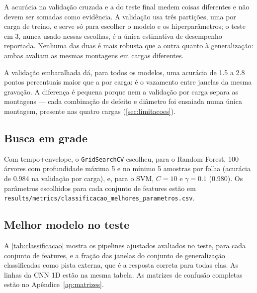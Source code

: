 A acurácia na validação cruzada e a do teste final medem coisas diferentes e
não devem ser somadas como evidência. A validação usa três partições, uma por
carga de treino, e serve só para escolher o modelo e os hiperparâmetros; o teste
em \SI{3}{\hp}, nunca usado nessas escolhas, é a única estimativa de desempenho
reportada. Nenhuma das duas é mais robusta que a outra quanto à generalização:
ambas avaliam as mesmas montagens em cargas diferentes.

A validação embaralhada dá, para todos os modelos, uma acurácia de \num{1.5} a
\num{2.8} pontos percentuais maior que a por carga: é o vazamento entre janelas da
mesma gravação. A diferença é pequena porque nem a validação por carga separa as
montagens --- cada combinação de defeito e diâmetro foi ensaiada numa única
montagem, presente nas quatro cargas (\autoref{sec:limitacoes}).

\subsection{Busca em grade}
\label{sec:res-grid}

Com tempo+envelope, o \texttt{GridSearchCV}
escolheu, para o Random Forest, 100 árvores com profundidade máxima 5 e no mínimo
5 amostras por folha (acurácia de \num{0.984} na validação por carga), e, para o
SVM, $C = 10$ e $\gamma = \num{0.1}$ (\num{0.980}). Os parâmetros escolhidos para
cada conjunto de features estão em
\texttt{results/metrics/classificacao\_melhores\_parametros.csv}.

\subsection{Melhor modelo no teste}
\label{sec:res-melhor-modelo}

A \autoref{tab:classificacao} mostra os
pipelines ajustados avaliados no teste, para cada conjunto de features, e a
fração das janelas do conjunto de generalização classificadas como pista
externa, que é a resposta correta para todas elas. As linhas da CNN 1D estão na
mesma tabela. As matrizes de confusão completas estão no
Apêndice~\ref{ap:matrizes}.

